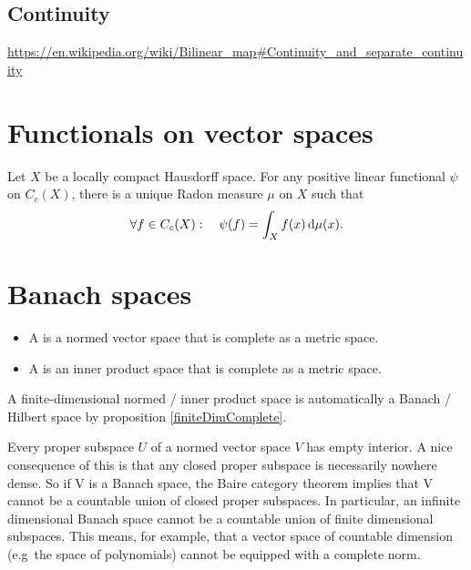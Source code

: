 \section{Continuity}
\url{https://en.wikipedia.org/wiki/Bilinear_map#Continuity_and_separate_continuity}



















\chapter{Functionals on vector spaces}

\begin{theorem}
Let $X$ be a locally compact Hausdorff space. For any positive linear functional $\psi$ on $C_c(X)$, there is a unique Radon measure $\mu$ on $X$ such that
\[ \forall f\in C_c(X): \quad \psi(f) = \int_X f(x)\operatorname{d \!}{\mu(x)}. \]
\end{theorem}














\chapter{Banach spaces}
\begin{definition}
\begin{itemize}
\item A  is a normed vector space that is complete as a metric space.
\item A  is an inner product space that is complete as a metric space.
\end{itemize}
\end{definition}

A finite-dimensional normed / inner product space is automatically a Banach / Hilbert space by proposition \ref{finiteDimComplete}.

Every proper subspace $U$ of a normed vector space $V$ has empty interior.
A nice consequence of this is that any closed proper subspace is necessarily nowhere dense. So if V is a Banach space, the Baire category theorem implies that V cannot be a countable union of closed proper subspaces. In particular, an infinite dimensional Banach space cannot be a countable union of finite dimensional subspaces. This means, for example, that a vector space of countable dimension (e.g\ the space of polynomials) cannot be equipped with a complete norm.

